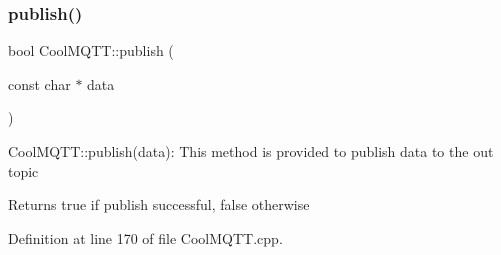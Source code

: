 \subsubsection{\texorpdfstring{publish()}{publish()}\hspace{0.1cm}{\footnotesize\ttfamily [1/2]}}
{\footnotesize\ttfamily bool Cool\+M\+Q\+T\+T\+::publish (\begin{DoxyParamCaption}\item[{const char $\ast$}]{data }\end{DoxyParamCaption})}

Cool\+M\+Q\+T\+T\+::publish(data)\+: This method is provided to publish data to the out topic

\begin{DoxyReturn}{Returns}
true if publish successful, false otherwise 
\end{DoxyReturn}


Definition at line 170 of file Cool\+M\+Q\+T\+T.\+cpp.


